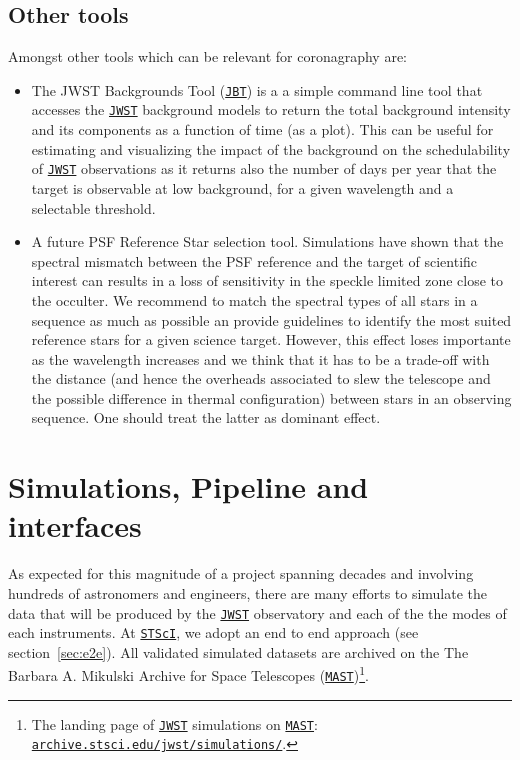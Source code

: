 \documentclass[]{spie}  %
\newcommand{\stsci}{{\tt \href{https://www.stsci.edu}{STScI}}\xspace}
\newcommand{\jwst}{{\tt \href{https://jwst.stsci.edu}{JWST}}\xspace}
\newcommand{\mast}{{\tt \href{https://archive.stsci.edu}{MAST}}\xspace}
\newcommand{\jbt}{{\tt \href{https://jwst-docs.stsci.edu/display/JPP/JWST+Backgrounds+Tool}{JBT}}\xspace}%
\def\begini{\begin{itemize}[itemsep=0.5pt,topsep=0.5pt]}
\def\endi{\end{itemize}}
\begin{document}
\subsection{Other tools}
\label{sec:other}

Amongst other tools which can be relevant for coronagraphy are:
\begini
\item The JWST Backgrounds Tool (\jbt) is a a simple command line tool that accesses the \jwst background models to return the total background intensity and its components as a function of time (as a plot). This can be useful for estimating and visualizing the impact of the background on the schedulability of \jwst observations as it returns also the number of days per year that the target is observable at low background, for a given wavelength and a selectable threshold. 
\item A future PSF Reference Star selection tool. Simulations have shown that the spectral mismatch between the PSF reference and the target of scientific interest can results in a loss of sensitivity in the speckle limited zone close to the occulter. We recommend to match the spectral types of all stars in a sequence as much as possible an provide guidelines to identify the most suited reference stars for a given science target\cite{jdox_psfreftool}. However, this effect loses importante as the wavelength increases and we think that it has to be a trade-off with the distance (and hence the overheads associated to slew the telescope and the possible difference in thermal configuration) between stars in an observing sequence. One should treat the latter as dominant effect.
\endi
%

\section{Simulations, Pipeline and interfaces}
\label{sec:sim}

As expected for this magnitude of a project spanning decades and involving hundreds of astronomers and engineers, there are many efforts to simulate the data that will be produced by the \jwst observatory and each of the the modes of each instruments. At \stsci, we adopt an end to end approach (see section~\ref{sec:e2e}). All validated simulated datasets are archived on the The Barbara A. Mikulski Archive for Space Telescopes (\mast)\footnote{The landing page of \jwst simulations on \mast: {\small \tt \href{http://archive.stsci.edu/jwst/simulations/index.html}{archive.stsci.edu/jwst/simulations/}}.}.
\end{document}

